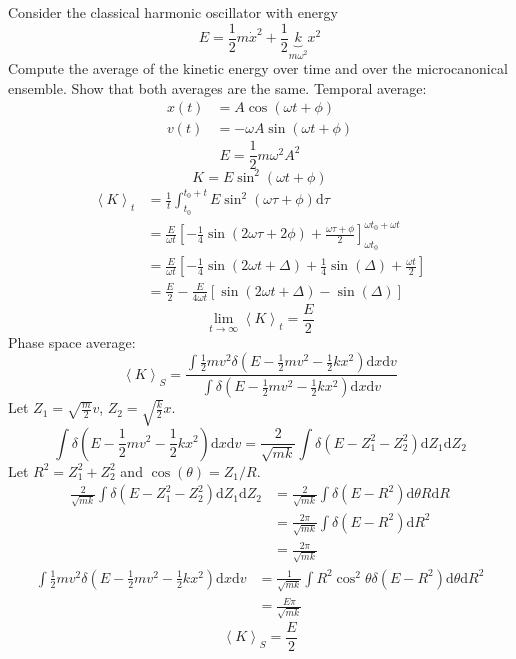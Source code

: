 \documentclass[letterpaper]{article}
\providecommand{\ainner}[1]{\left\langle#1\right\rangle}
\def\d{\mathrm{d}}
\begin{document}
\begin{multicols}{2}
 Consider the classical harmonic oscillator with energy 
\[
E=\frac{1}{2}m\dot x^2+\frac{1}{2}\underbrace{k}_{m\omega^2}x^2
\]
Compute the average of the kinetic energy over time and over the microcanonical
ensemble. Show that both averages are the same.
Temporal average:
\begin{align*}
x(t)&=A\cos(\omega t+\phi)\\
v(t)&=-\omega A\sin(\omega t+\phi)
\end{align*}
\[
E=\frac{1}{2}m\omega^2A^2
\]
\[
K=E\sin^2(\omega t+\phi)
\]
\begin{align*}
\ainner{K}_t&=\frac{1}{t}\int_{t_0}^{t_0+t}E\sin^2(\omega\tau+\phi)\d\tau\\
&=\frac{E}{\omega t}\left[-\frac{1}{4}\sin(2\omega\tau+2\phi)
+\frac{\omega\tau+\phi}{2}\right]_{\omega t_0}^{\omega t_0+\omega t}\\
&=\frac{E}{\omega t}\left[-\frac{1}{4}\sin(2\omega t+\Delta)
+\frac{1}{4}\sin(\Delta)+\frac{\omega t}{2}\right]\\
&=\frac{E}{2}-\frac{E}{4\omega t}\left[\sin(2\omega t+\Delta)-\sin(\Delta)\right]
\end{align*}
\[
\lim_{t\rightarrow\infty}\ainner{K}_t=\frac{E}{2}
\]
Phase space average:
\[
\ainner{K}_S=\frac{\int\frac{1}{2}mv^2
\delta\left(E-\frac{1}{2}mv^2-\frac{1}{2}kx^2\right)\d x\d v}
{\int\delta\left(E-\frac{1}{2}mv^2-\frac{1}{2}kx^2\right)\d x\d v}
\]
Let $Z_1=\sqrt{\frac{m}{2}}v$, $Z_2=\sqrt{\frac{k}{2}}x$.
\[
\int\delta\left(E-\frac{1}{2}mv^2-\frac{1}{2}kx^2\right)\d x\d v
=\frac{2}{\sqrt{mk}}\int\delta\left(E-Z_1^2-Z_2^2\right)\d Z_1\d Z_2
\]
Let $R^2=Z_1^2+Z_2^2$ and $\cos(\theta)=Z_1/R$.
\begin{align*}
\frac{2}{\sqrt{mk}}\int\delta\left(E-Z_1^2-Z_2^2\right)\d Z_1\d Z_2
&=\frac{2}{\sqrt{mk}}\int\delta\left(E-R^2\right)\d\theta R\d R\\
&=\frac{2\pi}{\sqrt{mk}}\int\delta(E-R^2)\d R^2\\
&=\frac{2\pi}{\sqrt{mk}}
\end{align*}
\begin{align*}
\int\frac{1}{2}mv^2 \delta\left(E-\frac{1}{2}mv^2-\frac{1}{2}kx^2\right)\d x\d v
&=\frac{1}{\sqrt{mk}}\int R^2\cos^2\theta\delta(E-R^2)\d\theta\d R^2\\
&=\frac{E\pi}{\sqrt{mk}}
\end{align*}
\[
\ainner{K}_S=\frac{E}{2}
\]


\end{multicols}
\end{document}
